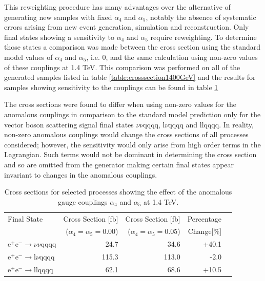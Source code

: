 This reweighting procedure has many advantages over the alternative of generating new samples with fixed $\alpha_{4}$ and $\alpha_{5}$, notably the absence of systematic errors arising from new event generation, simulation and reconstruction.  Only final states showing a sensitivity to $\alpha_{4}$ and $\alpha_{5}$ require reweighting.  To determine those states a comparison was made between the cross section using the standard model values of $\alpha_{4}$ and $\alpha_{5}$, i.e. 0, and the same calculation using non-zero values of these couplings at 1.4 TeV.  This comparison was performed on all of the generated samples listed in table \ref{table:crosssection1400GeV} and the results for samples showing sensitivity to the couplings can be found in table \ref{table:crosssectionsensitivity1400}

The cross sections were found to differ when using non-zero values for the anomalous couplings in comparison to the standard model prediction only for the vector boson scattering signal final states $\nu\nu\text{qqqq}$, $\text{l}\nu\text{qqqq}$ and llqqqq.  In reality, non-zero anomalous couplings would change the cross sections of all processes considered; however, the sensitivity would only arise from high order terms in the Lagrangian.  Such terms would not be dominant in determining the cross section and so are omitted from the generator making certain final states appear invariant to changes in the anomalous couplings.

\begin{table}[h!]
\centering
\begin{tabular}{ l r r r r }
\hline
Final State & Cross Section [fb] & Cross Section [fb] & Percentage \\ 
& ($\alpha_{4} = \alpha_{5} = 0.00$) & ($\alpha_{4} = \alpha_{5} = 0.05$) & Change[\%] \\ 
\hline
$\text{e}^{+}\text{e}^{-} \rightarrow \nu{\nu}\text{qqqq}$ & 24.7 & 34.6 & +40.1 \\
$\text{e}^{+}\text{e}^{-} \rightarrow \text{l}{\nu}\text{qqqq}$ & 115.3 & 113.0 & -2.0 \\
$\text{e}^{+}\text{e}^{-} \rightarrow \text{llqqqq}$ & 62.1 & 68.6 & +10.5 \\
\hline
\end{tabular}
\caption[Cross sections for selected processes showing the effect of the anomalous gauge couplings $\alpha_{4}$ and $\alpha_{5}$ at 1.4 TeV.]{Cross sections for selected processes showing the effect of the anomalous gauge couplings $\alpha_{4}$ and $\alpha_{5}$ at 1.4 TeV.}
\label{table:crosssectionsensitivity1400}
\end{table}

